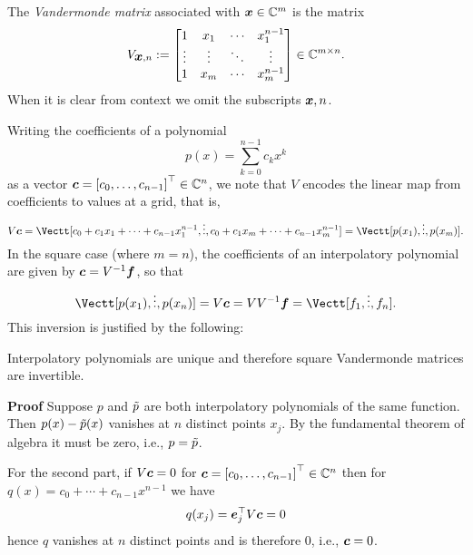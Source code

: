 \begin{definition}[Vandermonde] The \emph{Vandermonde matrix} associated with $\bm{{\mbox{\boldmath$x$\unboldmath}}} \in {\mathbb C}^m$ is the matrix
\[
V_{\ensuremath{\bm{\x}},n} := \begin{bmatrix} 1 & x_1 & \ensuremath{\cdots} & x_1^{n-1} \\
                    \ensuremath{\vdots} & \ensuremath{\vdots} & \ensuremath{\ddots} & \ensuremath{\vdots} \\
                    1 & x_m & \ensuremath{\cdots} & x_m^{n-1}
                    \end{bmatrix} \ensuremath{\in} \ensuremath{\bbC}^{m \ensuremath{\times} n}.
\]
When it is clear from context we omit the subscripts $\bm{{\mbox{\boldmath$x$\unboldmath}}},n$. \end{definition}

Writing the coefficients of a polynomial
\[
p(x) = \ensuremath{\sum}_{k=0}^{n-1} c_k x^k
\]
as a vector  $\ensuremath{\bm{\c}} = \vectt[c_0,\ensuremath{\ldots},c_{n-1}] \ensuremath{\in} \ensuremath{\bbC}^n$, we note that $V$ encodes the linear map from coefficients to values at a grid, that is,
\[
V\ensuremath{\bm{\c}} = \Vectt[c_0 + c_1 x_1 + \ensuremath{\cdots} + c_{n-1} x_1^{n-1}, \ensuremath{\vdots}, c_0 + c_1 x_m + \ensuremath{\cdots} + c_{n-1} x_m^{n-1}] = \Vectt[p(x_1),\ensuremath{\vdots},p(x_m)].
\]
In the square case (where $m=n$), the coefficients of an interpolatory polynomial are given by $\bm{{\mbox{\boldmath$c$\unboldmath}}} = V^{-1} \bm{{\mbox{\boldmath$f$\unboldmath}}}$, so that
\[
\Vectt[p(x_1),\ensuremath{\vdots},p(x_n)] = V \ensuremath{\bm{\c}} = V V^{-1} \ensuremath{\bm{\f}} = \Vectt[f_1,\ensuremath{\vdots},f_n].
\]
This inversion is justified by the following:

\begin{proposition} Interpolatory polynomials are unique and therefore square Vandermonde matrices are invertible.

\end{proposition}
\textbf{Proof} Suppose $p$ and ${\tilde p}$ are both interpolatory polynomials of the same function. Then $p(x) - {\tilde p}(x)$ vanishes at $n$ distinct points $x_j$. By the fundamental theorem of algebra it must be zero, i.e., $p = {\tilde p}$.

For the second part, if $V \bm{{\mbox{\boldmath$c$\unboldmath}}} = 0$ for $\ensuremath{\bm{\c}} = \vectt[c_0,\ensuremath{\ldots},c_{n-1}] \ensuremath{\in} \ensuremath{\bbC}^n$ then for $q(x) = c_0 + \ensuremath{\cdots} + c_{n-1} x^{n-1}$ we have
\[
q(x_j) = \bm{{\mbox{\boldmath$e$\unboldmath}}}_j^\top V \bm{{\mbox{\boldmath$c$\unboldmath}}} = 0
\]
hence $q$ vanishes at $n$ distinct points and is therefore 0, i.e., $\bm{{\mbox{\boldmath$c$\unboldmath}}} = 0$.

